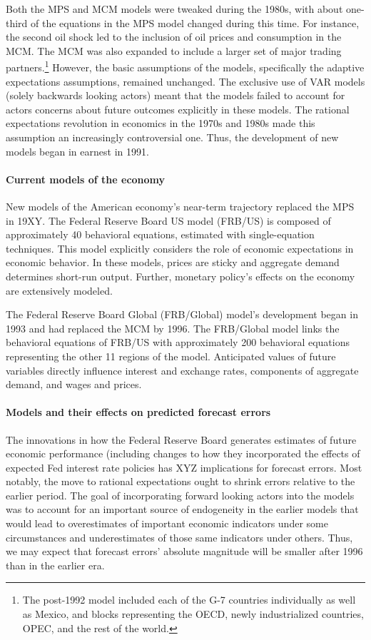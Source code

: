 \documentclass[a4paper]{article}\usepackage{graphicx, color}
\begin{document}
Both the MPS and MCM models were tweaked during the 1980s, with about one-third of the equations in the MPS model changed during this time. For instance, the second oil shock led to the inclusion of oil prices and consumption in the MCM. The MCM was also expanded to include a larger set of major trading partners.\footnote{The post-1992 model included each of the G-7 countries individually as well as Mexico, and blocks representing the OECD, newly industrialized countries, OPEC, and the rest of the world.} However, the basic assumptions of the models, specifically the adaptive expectations assumptions, remained unchanged. The exclusive use of VAR models (solely backwards looking actors) meant that the models failed to account for actors concerns about future outcomes explicitly in these models. The rational expectations revolution in economics in the 1970s and 1980s made this assumption an increasingly controversial one. Thus, the development of new models began in earnest in 1991.
 
\paragraph{Current models of the economy}
New models of the American economy's near-term trajectory replaced the MPS in 19XY. The Federal Reserve Board US model (FRB/US) is composed of approximately 40 behavioral equations, estimated with single-equation techniques. This model explicitly considers the role of economic expectations in economic behavior. In these models, prices are sticky and aggregate demand determines short-run output. Further, monetary policy's effects on the economy are extensively modeled. 

The Federal Reserve Board Global (FRB/Global) model's development began in 1993 and had replaced the MCM by 1996. The FRB/Global model links the behavioral equations of FRB/US with approximately 200 behavioral equations representing the other 11 regions of the model. Anticipated values of future variables directly influence interest and exchange rates, components of aggregate demand, and wages and prices.

\paragraph{Models and their effects on predicted forecast errors}
The innovations in how the Federal Reserve Board generates estimates of future economic performance (including changes to how they incorporated the effects of expected Fed interest rate policies has XYZ implications for forecast errors. Most notably, the move to rational expectations ought to shrink errors relative to the earlier period. The goal of incorporating forward looking actors into the models was to account for an important source of endogeneity in the earlier models that would lead to overestimates of important economic indicators under some circumstances and underestimates of those same indicators under others. Thus, we may expect that forecast errors' absolute magnitude will be smaller after 1996 than in the earlier era.
\end{document}
